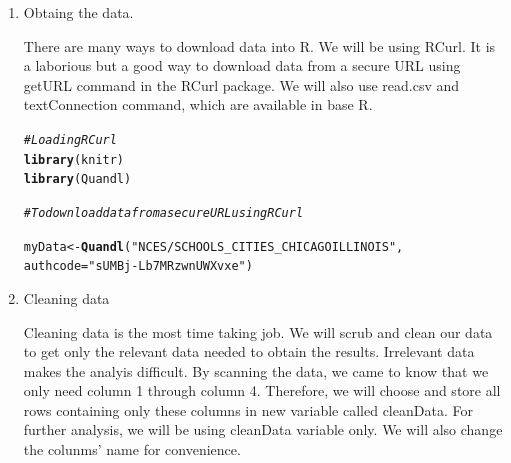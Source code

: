 \documentclass{article}\usepackage[]{graphicx}\usepackage[]{color}
\makeatletter
\newcommand{\hlstr}[1]{\textcolor[rgb]{0.192,0.494,0.8}{#1}}%
\newcommand{\hlcom}[1]{\textcolor[rgb]{0.678,0.584,0.686}{\textit{#1}}}%
\newcommand{\hlstd}[1]{\textcolor[rgb]{0.345,0.345,0.345}{#1}}%
\newcommand{\hlkwb}[1]{\textcolor[rgb]{0.69,0.353,0.396}{#1}}%
\newcommand{\hlkwc}[1]{\textcolor[rgb]{0.333,0.667,0.333}{#1}}%
\newcommand{\hlkwd}[1]{\textcolor[rgb]{0.737,0.353,0.396}{\textbf{#1}}}%
\newenvironment{kframe}{%
 \def\at@end@of@kframe{}%
 \ifinner\ifhmode%
  \def\at@end@of@kframe{\end{minipage}}%
  \begin{minipage}{\columnwidth}%
 \fi\fi%
 \def\FrameCommand##1{\hskip\@totalleftmargin \hskip-\fboxsep
 \colorbox{shadecolor}{##1}\hskip-\fboxsep
     \hskip-\linewidth \hskip-\@totalleftmargin \hskip\columnwidth}%
 \MakeFramed {\advance\hsize-\width
   \@totalleftmargin\z@ \linewidth\hsize
   \@setminipage}}%
 {\par\unskip\endMakeFramed%
 \at@end@of@kframe}
\newenvironment{knitrout}{}{} %
\makeatother
\begin{document}
\begin{enumerate}
    \item Obtaing the data.

There are many ways to download data into R. We will be using RCurl. It is a laborious but a good way to download data from a secure URL using getURL command in the RCurl package. We will also use read.csv and textConnection command, which are available in base R.

\begin{knitrout}
\color{fgcolor}\begin{kframe}
\begin{alltt}
\hlcom{# Loading RCurl}
\hlkwd{library}\hlstd{(knitr)}
\hlkwd{library}\hlstd{(Quandl)}

\hlcom{# To download data from a secure URL using RCurl}

\hlstd{myData} \hlkwb{<-} \hlkwd{Quandl}\hlstd{(}\hlstr{"NCES/SCHOOLS_CITIES_CHICAGOILLINOIS"}\hlstd{,}
                 \hlkwc{authcode}\hlstd{=}\hlstr{"sUMBj-Lb7MRzwnUWXvxe"}\hlstd{)}
\end{alltt}
\end{kframe}
\end{knitrout}
\item Cleaning data 
 
Cleaning data is the most time taking job. We will scrub and clean our data to get only the relevant data needed to obtain the results. Irrelevant data makes the analyis difficult. By scanning the data, we came to know that we only need column 1 through column 4. Therefore, we will choose and store all rows containing only these columns in new variable called cleanData. For further analysis, we will be using cleanData variable only. We will also change the colunms' name for convenience.


\end{enumerate}
\end{document}
